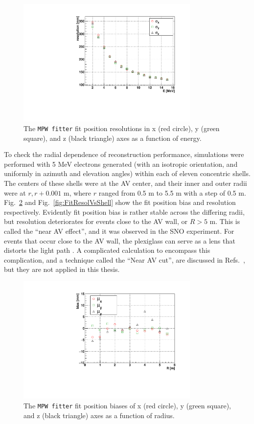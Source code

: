 \begin{figure}[htbp]
	\centering	
	\includegraphics[width=9cm]{MPW_isoFill_posResolVsE.pdf}
	\caption[The \texttt{MPW fitter} fit position resolutions ($\sigma_{x,y,z}$) as a function of energy.]{The \texttt{MPW fitter} fit position resolutions in x (red circle), y (green square), and z (black triangle) axes as a function of energy.	\label{fig:MPWposResol_isoFill}}
\end{figure}

To check the radial dependence of reconstruction performance, simulations were performed with 5 MeV electrons generated (with an isotropic orientation, and uniformly in azimuth and elevation angles) within each of eleven concentric shells. The centers of these shells were at the AV center, and their inner and outer radii were at $r, r+0.001$ m, where $r$ ranged from 0.5 m to 5.5 m with a step of 0.5 m. Fig.~\ref{fig:FitBiasVsShell} and Fig.~\ref{fig:FitResolVsShell} show the fit position bias and resolution respectively. Evidently fit position bias is rather stable across the differing radii, but resolution deteriorates for events close to the AV wall, or $R>5$ m. This is called the ``near AV effect'', and it was observed in the SNO experiment. For events that occur close to the AV wall, the plexiglass can serve as a lens that distorts the light path \cite{brice1996monte}. A complicated calculation to encompass this complication, and a technique called the ``Near AV cut'', are discussed in Refs.~\cite{coulter2013modelling,jones2011background}, but they are not applied in this thesis. 

\begin{figure}[htbp]
	\centering	
	\includegraphics[width=9cm]{shellTest_RvsBias.pdf}
	\caption[The \texttt{MPW fitter} fit position biases ($\mu_{x,y,z}$) as a function of energies.]{The \texttt{MPW fitter} fit position biases of x (red circle), y (green square), and z (black triangle) axes as a function of radius.}
	\label{fig:FitBiasVsShell}
\end{figure}

